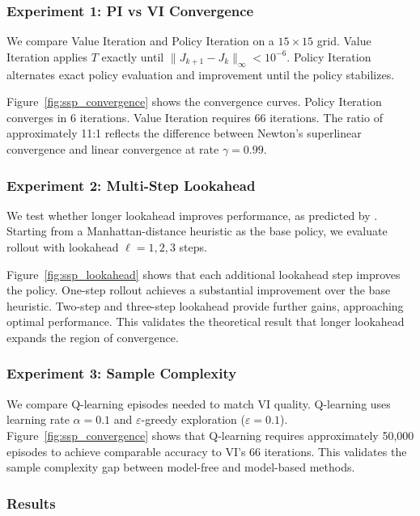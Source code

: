 \subsubsection{Experiment 1: PI vs VI Convergence}

We compare Value Iteration and Policy Iteration on a $15 \times 15$ grid. Value Iteration applies $T$ exactly until $\|J_{k+1} - J_k\|_\infty < 10^{-6}$. Policy Iteration alternates exact policy evaluation and improvement until the policy stabilizes.

Figure~\ref{fig:ssp_convergence} shows the convergence curves. Policy Iteration converges in 6 iterations. Value Iteration requires 66 iterations. The ratio of approximately 11:1 reflects the difference between Newton's superlinear convergence and linear convergence at rate $\gamma = 0.99$.

\subsubsection{Experiment 2: Multi-Step Lookahead}

We test whether longer lookahead improves performance, as predicted by \citet{bertsekas2024}. Starting from a Manhattan-distance heuristic as the base policy, we evaluate rollout with lookahead $\ell = 1, 2, 3$ steps.

Figure~\ref{fig:ssp_lookahead} shows that each additional lookahead step improves the policy. One-step rollout achieves a substantial improvement over the base heuristic. Two-step and three-step lookahead provide further gains, approaching optimal performance. This validates the theoretical result that longer lookahead expands the region of convergence.

\subsubsection{Experiment 3: Sample Complexity}

We compare Q-learning episodes needed to match VI quality. Q-learning uses learning rate $\alpha = 0.1$ and $\varepsilon$-greedy exploration ($\varepsilon = 0.1$). Figure~\ref{fig:ssp_convergence} shows that Q-learning requires approximately 50,000 episodes to achieve comparable accuracy to VI's 66 iterations. This validates the sample complexity gap between model-free and model-based methods.

\subsubsection{Results}

